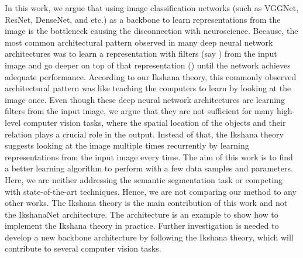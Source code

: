 \documentclass{article}
\begin{document}
In this work, we argue that using image classification networks (such as VGGNet\cite{7486599}, ResNet\cite{he2016deep}, DenseNet\cite{huang2017densely}, and etc.) as a backbone to learn representations from the image is the bottleneck causing the disconnection with neuroscience. Because, the most common architectural pattern observed in many deep neural network architectures was to learn a representation with  filters (say ) from the input image and go deeper on top of that representation () until the network achieves adequate performance. According to our Ikshana theory, this commonly observed architectural pattern was like teaching the computers to learn by looking at the image once. Even though these deep neural network architectures are learning  filters from the input image, we argue that they are not sufficient for many high-level computer vision tasks, where the spatial location of the objects and their relation plays a crucial role in the output.
Instead of that, the Ikshana theory suggests looking at the image multiple times recurrently by learning representations from the input image every time.\newline
The aim of this work is to find a better learning algorithm to perform with a few data samples and parameters. Here, we are neither addressing the semantic segmentation task or competing with state-of-the-art techniques. Hence, we are not comparing our method to any other works.\newline
The Ikshana theory is the main contribution of this work and not the IkshanaNet architecture. The architecture is an example to show how to implement the Ikshana theory in practice. Further investigation is needed to develop a new backbone architecture by following the Ikshana theory,  which will contribute to several computer vision tasks.
\end{document}

